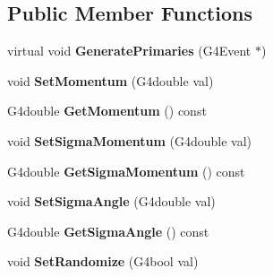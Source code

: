 \subsection*{Public Member Functions}
\begin{DoxyCompactItemize}
\item 
\hypertarget{class_b5_primary_generator_action_a2a69d1cd59e5f8060a5d830f294d1795}{}virtual void {\bfseries Generate\+Primaries} (G4\+Event $\ast$)\label{class_b5_primary_generator_action_a2a69d1cd59e5f8060a5d830f294d1795}

\item 
\hypertarget{class_b5_primary_generator_action_ad97348ea28b05461d572b853d2dd4d87}{}void {\bfseries Set\+Momentum} (G4double val)\label{class_b5_primary_generator_action_ad97348ea28b05461d572b853d2dd4d87}

\item 
\hypertarget{class_b5_primary_generator_action_abb16b53f40a8ebd6cdbd629ef30a73ba}{}G4double {\bfseries Get\+Momentum} () const \label{class_b5_primary_generator_action_abb16b53f40a8ebd6cdbd629ef30a73ba}

\item 
\hypertarget{class_b5_primary_generator_action_a5fdcff70e700e89b1c27d9532b10a85c}{}void {\bfseries Set\+Sigma\+Momentum} (G4double val)\label{class_b5_primary_generator_action_a5fdcff70e700e89b1c27d9532b10a85c}

\item 
\hypertarget{class_b5_primary_generator_action_ae55153c1ba70382405a8e540f262776c}{}G4double {\bfseries Get\+Sigma\+Momentum} () const \label{class_b5_primary_generator_action_ae55153c1ba70382405a8e540f262776c}

\item 
\hypertarget{class_b5_primary_generator_action_ac5ec2122899938a5322d5797d771d574}{}void {\bfseries Set\+Sigma\+Angle} (G4double val)\label{class_b5_primary_generator_action_ac5ec2122899938a5322d5797d771d574}

\item 
\hypertarget{class_b5_primary_generator_action_a320777d723a43d5868edfe253b438040}{}G4double {\bfseries Get\+Sigma\+Angle} () const \label{class_b5_primary_generator_action_a320777d723a43d5868edfe253b438040}

\item 
\hypertarget{class_b5_primary_generator_action_ab411c002c48e1180008fb00250f22429}{}void {\bfseries Set\+Randomize} (G4bool val)\label{class_b5_primary_generator_action_ab411c002c48e1180008fb00250f22429}


\end{DoxyCompactItemize}
